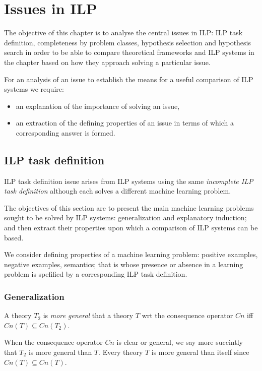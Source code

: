 \chapter{Issues in ILP}\label{chap:issues_in_ilp}
The objective of this chapter is to analyse the central issues in ILP: ILP task definition, completeness by problem classes, hypothesis selection and hypothesis search in order to be able to compare theoretical frameworks and ILP systems in the chapter  based on how they approach solving a particular issue.

For an analysis of an issue to establish the means for a useful comparison of ILP systems we require:
\begin{itemize}
\item an explanation of the importance of solving an issue,
\item an extraction of the defining properties of an issue in terms of which a corresponding answer is formed.
\end{itemize}

\section{ILP task definition}\label{sec:ilp_task_definition}
ILP task definition issue arises from ILP systems using the same \emph{incomplete ILP task definition} although each solves a different machine learning problem.

The objectives of this section are to present the main machine learning problems sought to be solved by ILP systems: generalization and explanatory induction; and then extract their properties upon which a comparison of ILP systems can be based.

We consider defining properties of a machine learning problem: positive examples, negative examples, semantics; that is whose presence or absence in a learning problem is spefified by a corresponding ILP task definition.

\subsection{Generalization}\label{generalization}

\begin{defn}
A theory $T_2$ is \emph{more general} that a theory $T$ wrt the consequence operator $Cn$ iff $Cn(T) \subseteq Cn(T_2)$.
\end{defn}
When the consequence operator $Cn$ is clear or general, we say more succintly that $T_2$ is more general than $T$. Every theory $T$ is more general than itself since $Cn(T) \subseteq Cn(T)$.

